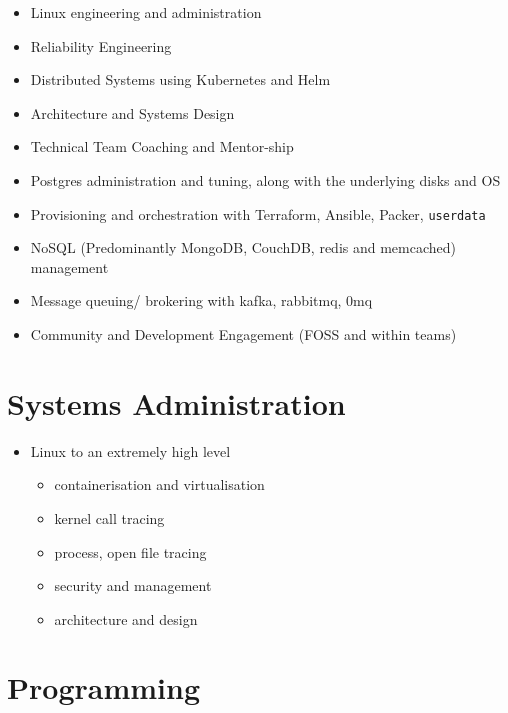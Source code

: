 \documentclass[11pt,a4paper,sans]{article}
\begin{document}
\begin{itemize}
\item Linux engineering and administration
\item Reliability Engineering
\item Distributed Systems using Kubernetes and Helm
\item Architecture and Systems Design
\item Technical Team Coaching and Mentor-ship
\item Postgres administration and tuning, along with the underlying disks and OS
\item Provisioning and orchestration with Terraform, Ansible, Packer, \texttt{userdata}
\item NoSQL (Predominantly MongoDB, CouchDB, redis and memcached) management
\item Message queuing/ brokering with kafka, rabbitmq, 0mq
\item Community and Development Engagement (FOSS and within teams)
\end{itemize}

\section{Systems Administration}

\begin{itemize}
\item Linux to an extremely high level
  \begin{itemize}
  \item containerisation and virtualisation
  \item kernel call tracing
  \item process, open file tracing
  \item security and management
  \item architecture and design
  \end{itemize}
\end{itemize}

\section{Programming}
\end{document}
